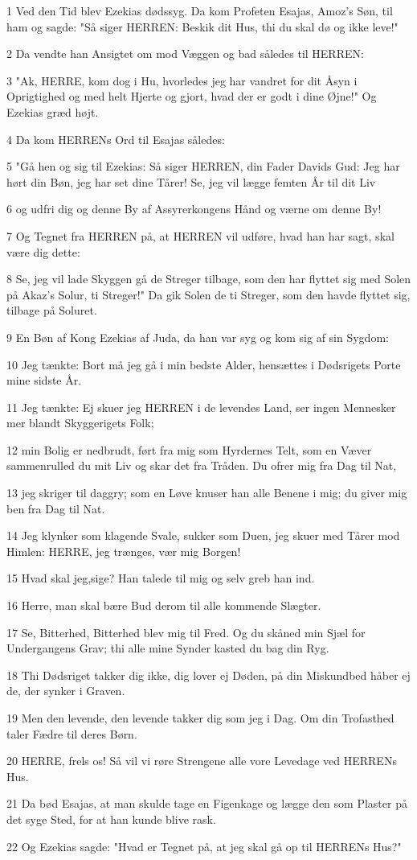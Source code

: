 \par 1 Ved den Tid blev Ezekias dødssyg. Da kom Profeten Esajas, Amoz's Søn, til ham og sagde: "Så siger HERREN: Beskik dit Hus, thi du skal dø og ikke leve!"
\par 2 Da vendte han Ansigtet om mod Væggen og bad således til HERREN:
\par 3 "Ak, HERRE, kom dog i Hu, hvorledes jeg har vandret for dit Åsyn i Oprigtighed og med helt Hjerte og gjort, hvad der er godt i dine Øjne!" Og Ezekias græd højt.
\par 4 Da kom HERRENs Ord til Esajas således:
\par 5 "Gå hen og sig til Ezekias: Så siger HERREN, din Fader Davids Gud: Jeg har hørt din Bøn, jeg har set dine Tårer! Se, jeg vil lægge femten År til dit Liv
\par 6 og udfri dig og denne By af Assyrerkongens Hånd og værne om denne By!
\par 7 Og Tegnet fra HERREN på, at HERREN vil udføre, hvad han har sagt, skal være dig dette:
\par 8 Se, jeg vil lade Skyggen gå de Streger tilbage, som den har flyttet sig med Solen på Akaz's Solur, ti Streger!" Da gik Solen de ti Streger, som den havde flyttet sig, tilbage på Soluret.
\par 9 En Bøn af Kong Ezekias af Juda, da han var syg og kom sig af sin Sygdom:
\par 10 Jeg tænkte: Bort må jeg gå i min bedste Alder, hensættes i Dødsrigets Porte mine sidste År.
\par 11 Jeg tænkte: Ej skuer jeg HERREN i de levendes Land, ser ingen Mennesker mer blandt Skyggerigets Folk;
\par 12 min Bolig er nedbrudt, ført fra mig som Hyrdernes Telt, som en Væver sammenrulled du mit Liv og skar det fra Tråden. Du ofrer mig fra Dag til Nat,
\par 13 jeg skriger til daggry; som en Løve knuser han alle Benene i mig; du giver mig ben fra Dag til Nat.
\par 14 Jeg klynker som klagende Svale, sukker som Duen, jeg skuer med Tårer mod Himlen: HERRE, jeg trænges, vær mig Borgen!
\par 15 Hvad skal jeg,sige? Han talede til mig og selv greb han ind.
\par 16 Herre, man skal bære Bud derom til alle kommende Slægter.
\par 17 Se, Bitterhed, Bitterhed blev mig til Fred. Og du skåned min Sjæl for Undergangens Grav; thi alle mine Synder kasted du bag din Ryg.
\par 18 Thi Dødsriget takker dig ikke, dig lover ej Døden, på din Miskundbed håber ej de, der synker i Graven.
\par 19 Men den levende, den levende takker dig som jeg i Dag. Om din Trofasthed taler Fædre til deres Børn.
\par 20 HERRE, frels os! Så vil vi røre Strengene alle vore Levedage ved HERRENs Hus.
\par 21 Da bød Esajas, at man skulde tage en Figenkage og lægge den som Plaster på det syge Sted, for at han kunde blive rask.
\par 22 Og Ezekias sagde: "Hvad er Tegnet på, at jeg skal gå op til HERRENs Hus?"

